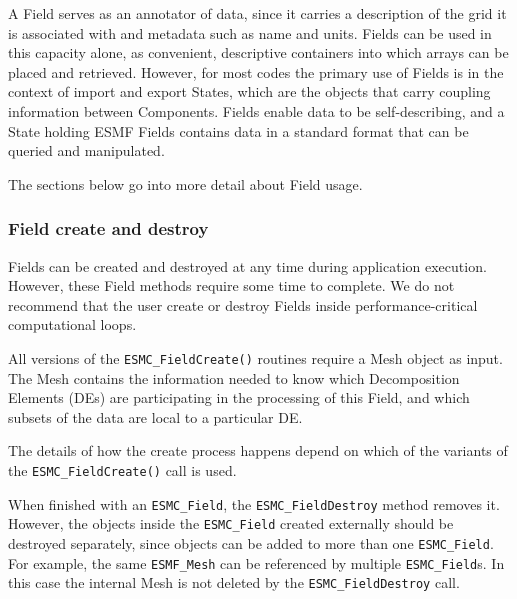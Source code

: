


A Field serves as an annotator of data, since it carries 
a description of the grid it is associated with and metadata 
such as name and units.  Fields can be used in this capacity
alone, as convenient, descriptive containers into which arrays 
can be placed and retrieved.  However, for most codes the primary 
use of Fields is in the context of import and export States,
which are the objects that carry coupling information between 
Components.  Fields enable data to be self-describing, and a
State holding ESMF Fields contains data in a standard format
that can be queried and manipulated.  

The sections below go into more detail about Field usage.

\subsubsection{Field create and destroy}

Fields can be created and destroyed at any time during 
application execution.  However, these Field methods require 
some time to complete.  We do not recommend that the user
create or destroy Fields inside performance-critical 
computational loops.

All versions of the {\tt ESMC\_FieldCreate()} 
routines require a Mesh object as input.
The Mesh contains the information needed to know which 
Decomposition Elements (DEs) are participating in 
the processing of this Field, and which subsets of the data
are local to a particular DE.

The details of how the create process happens depend
on which of the variants of the {\tt ESMC\_FieldCreate()} 
call is used.

When finished with an {\tt ESMC\_Field}, the {\tt ESMC\_FieldDestroy} method
removes it.  However, the objects inside the {\tt ESMC\_Field}
created externally should be destroyed separately, 
since objects can be added to
more than one {\tt ESMC\_Field}.  For example, the same {\tt ESMF\_Mesh}
can be referenced by multiple {\tt ESMC\_Field}s.  In this case the
internal Mesh is not deleted by the {\tt ESMC\_FieldDestroy} call.
